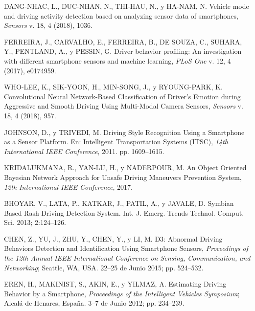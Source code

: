 
\begin{thebibliography}{9}
DANG-NHAC, L., DUC-NHAN, N., THI-HAU, N., y HA-NAM, N. Vehicle mode and driving activity detection based on analyzing sensor data of smartphones, \textit{Sensors} v. 18, 4 (2018), 1036.

FERREIRA, J., CARVALHO, E., FERREIRA, B., DE SOUZA, C., SUHARA, Y., PENTLAND, A., y PESSIN, G. Driver behavior profiling: An investigation with different smartphone sensors and machine learning, \textit{PLoS One} v. 12, 4 (2017), e0174959.

WHO-LEE, K., SIK-YOON, H., MIN-SONG, J., y RYOUNG-PARK, K. Convolutional Neural Network-Based Classification of Driver’s Emotion during Aggressive and Smooth Driving Using Multi-Modal Camera Sensors, \textit{Sensors} v. 18, 4 (2018), 957.

JOHNSON, D., y TRIVEDI, M. Driving Style Recognition Using a Smartphone as a Sensor Platform. En: Intelligent Transportation Systems (ITSC), \textit{14th International IEEE Conference}, 2011. pp. 1609–1615.

KRIDALUKMANA, R., YAN-LU, H., y NADERPOUR, M. An Object Oriented Bayesian Network Approach for Unsafe Driving Maneuvers Prevention System, \textit{12th International IEEE Conference}, 2017.

BHOYAR, V., LATA, P., KATKAR, J., PATIL, A., y JAVALE, D. Symbian Based Rash Driving Detection System. Int. J. Emerg. Trends Technol. Comput. Sci. 2013; 2:124–126.

CHEN, Z., YU, J., ZHU, Y., CHEN, Y., y LI, M. D3: Abnormal Driving Behaviors Detection and Identification Using Smartphone Sensors, \textit{Proceedings of the 12th Annual IEEE International Conference on Sensing, Communication, and Networking}; Seattle, WA, USA. 22–25 de Junio 2015; pp. 524–532.

EREN, H., MAKINIST, S., AKIN, E., y YILMAZ, A. Estimating Driving Behavior by a Smartphone, \textit{Proceedings of the Intelligent Vehicles Symposium}; Alcalá de Henares, Espa\~{n}a. 3–7 de Junio 2012; pp. 234–239.


\end{thebibliography}

